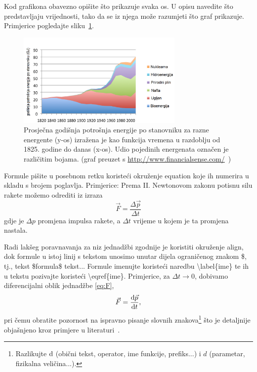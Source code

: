 \documentclass[12pt,a4paper,oneside]{article}
\begin{document}
\begin{linenumbers}
		Kod grafikona obavezno opišite što prikazuje svaka os. U opisu navedite što predstavljaju vrijednosti, tako da se iz njega može razumjeti što graf prikazuje. Primjerice pogledajte sliku~\ref{sl:E}.
		
		\begin{figure}[t]
			\centering
			\includegraphics[width=0.72\textwidth]{slika_E-potrosnja.png}
			\caption[Prosječna godišnja potrošnja energije po stanovniku.]{\label{sl:E}Prosječna godišnja potrošnja energije po stanovniku za razne energente (y-os) izražena je kao funkcija vremena u razdoblju od 1825. godine do danas (x-os). Udio pojedinih energenata označen je različitim bojama. (graf preuzet s \protect\url{http://www.financialsense.com/}~\cite{web1})}
		\end{figure}
		
		Formule pišite u posebnom retku koristeći okruženje {\color{red}equation} koje ih numerira u skladu s brojem poglavlja. Primjerice:
		Prema II. Newtonovom zakonu potisnu silu rakete možemo odrediti iz izraza
		\begin{equation}\label{eq:F}
		\vec{F}=\frac{\Delta \vec{p}}{\Delta t}
		\end{equation}
		gdje je $\Delta p$ promjena impulsa rakete, a $\Delta t$ vrijeme u kojem je ta promjena nastala. 
		
		Radi lakšeg poravnavanja za niz jednadžbi zgodnije je koristiti okruženje {\color{red}align}, dok formule u istoj linij s tekstom unosimo unutar dijela ograničenog znakom {\color{red}\$}, tj., tekst {\color{red}\$}formula{\color{red}\$} tekst... Formule imenujte koristeći naredbu {\color{red}\textbackslash label\{{\color{black}ime}\}} te ih u tekstu pozivajte koristeći {\color{red}\textbackslash eqref\{{\color{black}ime}\}}. Primjerice, za $\Delta t \to 0$, dobivamo diferencijalni oblik jednadžbe \eqref{eq:F},
		\begin{equation}
		\vec{F}=\frac{\mathrm{d} \vec{p}}{\mathrm{d} t},
		\end{equation}
		pri čemu obratite pozornost na ispravno pisanje slovnih znakova\footnote{Razlikujte $\mathrm{d}$ (obični tekst, operator, ime funkcije, prefiks...) i $d$ (parametar, fizikalna veličina...).} što je detaljnije objašnjeno kroz primjere u literaturi~\cite{formule}. 
		

\end{linenumbers}
\end{document}
